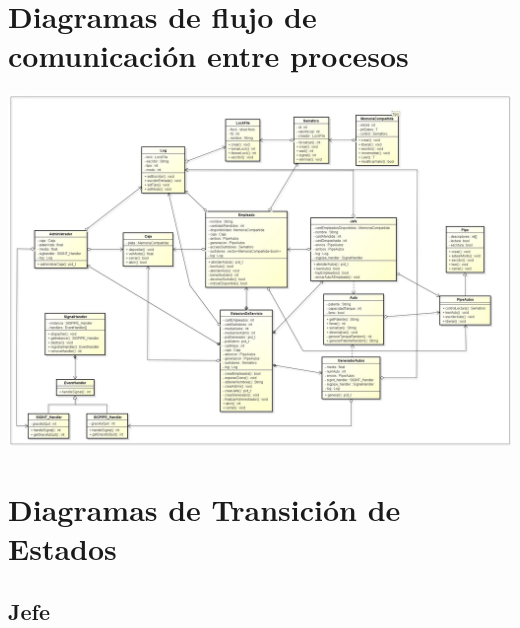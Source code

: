 \documentclass[a4paper,12pt]{article}
\begin{document}
\section{Diagramas de flujo de comunicación entre procesos}

\includegraphics[width=\textwidth]{clases.jpg} 
\newpage


\section{Diagramas de Transición de Estados}
\subsection{Jefe}
\end{document}
